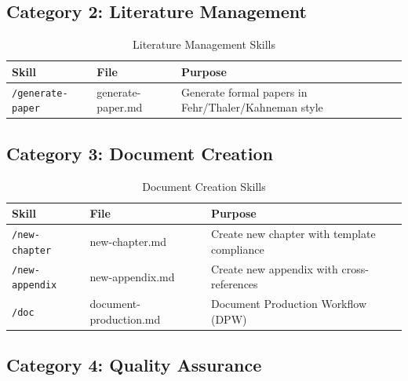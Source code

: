 \subsection{Category 2: Literature Management}

\begin{table}[htbp]
\centering
\begin{tabular}{|l|l|p{6cm}|}
\hline
\textbf{Skill} & \textbf{File} & \textbf{Purpose} \\
\hline
\texttt{/generate-paper} & generate-paper.md & Generate formal papers in Fehr/Thaler/Kahneman style \\
\hline
\end{tabular}
\caption{Literature Management Skills}
\end{table}


\subsection{Category 3: Document Creation}

\begin{table}[htbp]
\centering
\begin{tabular}{|l|l|p{6cm}|}
\hline
\textbf{Skill} & \textbf{File} & \textbf{Purpose} \\
\hline
\texttt{/new-chapter} & new-chapter.md & Create new chapter with template compliance \\
\texttt{/new-appendix} & new-appendix.md & Create new appendix with cross-references \\
\texttt{/doc} & document-production.md & Document Production Workflow (DPW) \\
\hline
\end{tabular}
\caption{Document Creation Skills}
\end{table}


\subsection{Category 4: Quality Assurance}

